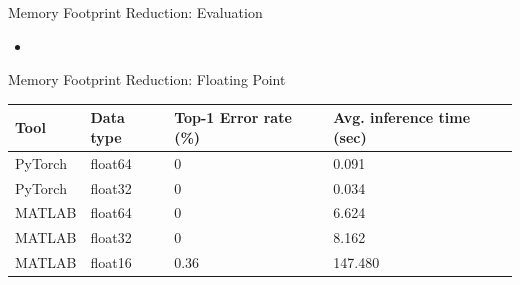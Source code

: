 \begin{frame}{Memory Footprint Reduction: Evaluation}
	\begin{itemize}
		\item
	\end{itemize}
\end{frame}

\begin{frame}{Memory Footprint Reduction: Floating Point}
	\begin{table}[H]
		\centering
		\begin{tabular}{p{2cm} p{2cm} p{3cm} p{3cm}}
			\toprule
			\textbf{Tool} & \textbf{Data type} & \textbf{Top-1 Error rate (\%)} & \textbf{Avg. inference time (sec)} \\
			\midrule
			PyTorch       & float64            & 0                              & 0.091                              \\
			PyTorch       & float32            & 0                              & 0.034                              \\
			MATLAB        & float64            & 0                              & 6.624                              \\
			MATLAB        & float32            & 0                              & 8.162                              \\
			MATLAB        & float16            & 0.36                           & 147.480                            \\
			\bottomrule
		\end{tabular}
	\end{table}
\end{frame}

